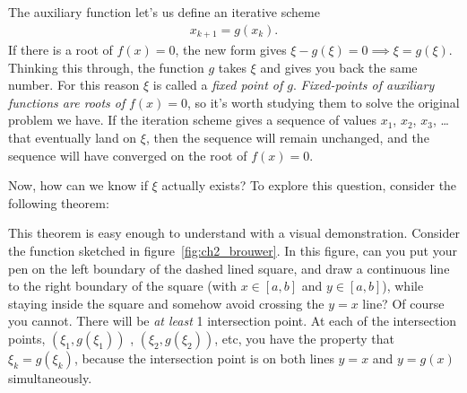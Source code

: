 
The auxiliary function let's us define an iterative scheme
\begin{align*}
x_{k+1} = g(x_k).
\end{align*}
If there is a root of $f(x)=0$, the new form gives $\xi - g(\xi)=0 \implies \xi=g(\xi)$. Thinking this through, the function $g$ takes $\xi$ and gives you back the same number. For this reason $\xi$ is called a \textit{fixed point of $g$}. \textit{Fixed-points of auxiliary functions are roots of} $f(x)=0$, so it's worth studying them to solve the original problem we have. If the iteration scheme gives a sequence of values $x_1$, $x_2$, $x_3$, \dots that eventually land on $\xi$, then the sequence will remain unchanged, and the sequence will have converged on the root of $f(x)=0$. 

Now, how can we know if $\xi$ actually exists? To explore this question, consider the following theorem:


This theorem is easy enough to understand with a visual demonstration. Consider the function sketched in figure~\ref{fig:ch2_brouwer}. In this figure, can you put your pen on the left boundary of the dashed lined square, and draw a continuous line to the right boundary of the square (with $x\in[a,b]$ and $y\in[a,b]$), while staying inside the square and somehow avoid crossing the $y=x$ line? Of course you cannot. There will be \textit{at least} 1 intersection point. At each of the intersection points, $(\xi_1,g(\xi_1))$ , $(\xi_2,g(\xi_2))$, etc, you have the property that $\xi_k = g(\xi_k)$, because the intersection point is on both lines $y=x$ and $y=g(x)$ simultaneously.

